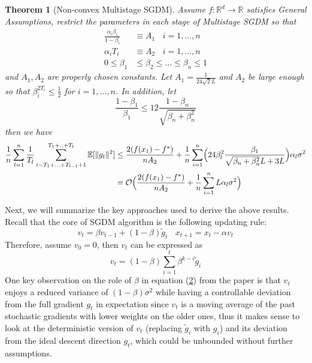 \documentclass{article}
\newtheorem{theorem}{Theorem}[section]
\begin{document}
\begin{theorem}[Non-convex Multistage SGDM]
	\label{theom43} Assume $f:\mathbb{R}^d \rightarrow \mathbb{R}$ satisfies General Assumptions, restrict the parameters in each stage of Multistage SGDM so that 
\begin{equation}
\label{eq41}
\begin{split}
\frac{\alpha_i\beta_i}{1 - \beta_i} &\equiv A_1 \ \ \ \ i = 1,...,n\\
\alpha_iT_i &\equiv A_2 \ \ \ \ i = 1,...,n\\
0 \leq \beta_1 &\leq \beta_2 \leq ... \leq \beta_n \leq 1
\end{split}
\end{equation}
and $A_1, A_2$ are properly chosen constants. Let $A_1 = \frac{1}{24\sqrt{2}L}$ and $A_2$ be large enough so that $\beta_i^{2T_i} \leq \frac{1}{2}$ for $i = 1,...,n$. In addition, let
\[
\frac{1 - \beta_1}{\beta_1} \leq 12 \frac{1 - \beta_n}{\sqrt{\beta_n + \beta_n^2}}
\] then we have
\[
\begin{split}
\frac{1}{n}\sum_{l = 1}^{n}\frac{1}{T_l}\sum_{i = T_1 + ... + T_{l - 1} + 1}^{T_1 + .. + T_l}\mathbb{E}[\|g_t\|^2] &\leq \frac{2(f(x_1) - f^*)}{nA_2} + \frac{1}{n}\sum_{i = 1}^n\Bigl(24\beta^2_l\frac{\beta_1}{\sqrt{\beta_n + \beta_n^2}L + 3L}\Bigr)\alpha_l\sigma^2\\
&= \mathcal{O}\Bigl(\frac{2(f(x_1) - f^*)}{nA_2} + \frac{1}{n}\sum_{i = 1}^nL\alpha_l\sigma^2\Bigr)
\end{split}
\]
\end{theorem}
Next, we will summarize the key approaches used to derive the above results. Recall that the core of SGDM algorithm is the following updating rule:
\[
v_t = \beta v_{t - 1} + (1 - \beta)\tilde{g}_t \ \ \ \
x_{t + 1} = x_t - \alpha v_t
\]
Therefore, assume $v_0 = 0$, then $v_t$ can be expressed as 
\begin{equation}
\label{eq42}
v_t = (1 - \beta)\sum_{i = 1}^{t}\beta^{k - i}\tilde{g}_i
\end{equation}
One key observation on the role of $\beta$ in equation (\hyperref[eq42]{2}) from the paper is that $v_t$ enjoys a reduced variance of $(1 - \beta)\sigma^2$ while having a controllable deviation from the full gradient $g_t$ in expectation since $v_t$ is a moving average of the past stochastic gradients with lower weights on the older ones, thus it makes sense to look at the deterministic version of $v_t$ (replacing $\tilde{g}_i$ with $g_i$) and its deviation from the ideal descent direction $g_t$, which could be unbounded without further assumptions.
\end{document}
